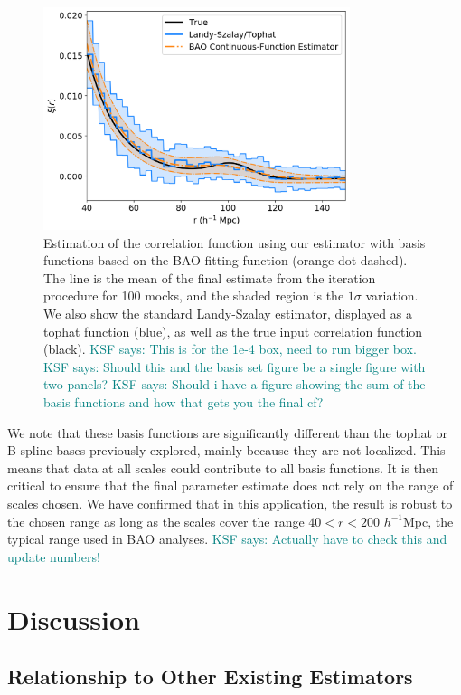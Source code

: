 \documentclass[modern]{aastex62}
\newcommand{\hmpc}{$h^{-1}$Mpc}
\newcommand{\KSF}[1]{\textcolor{teal}{KSF says: #1}}
\begin{document}
\label{fig:bao}
\begin{figure}[th]
\centering
    \includegraphics[width=0.8\textwidth]{bao}
    \caption{Estimation of the correlation function using our estimator with basis functions based on the BAO fitting function (orange dot-dashed). The line is the mean of the final estimate from the iteration procedure for 100 mocks, and the shaded region is the $1\sigma$ variation. We also show the standard Landy-Szalay estimator, displayed as a tophat function (blue), as well as the true input correlation function (black). \KSF{This is for the 1e-4 box, need to run bigger box.} \KSF{Should this and the basis set figure be a single figure with two panels?} \KSF{Should i have a figure showing the sum of the basis functions and how that gets you the final cf?}}
\end{figure}

We note that these basis functions are significantly different than the tophat or B-spline bases previously explored, mainly because they are not localized.
This means that data at all scales could contribute to all basis functions.
It is then critical to ensure that the final parameter estimate does not rely on the range of scales chosen.
We have confirmed that in this application, the result is robust to the chosen range as long as the scales cover the range $40<r<200$ \hmpc, the typical range used in BAO analyses. \KSF{Actually have to check this and update numbers!}


\section{Discussion} \label{sec:discuss}

\subsection{Relationship to Other Existing Estimators}
\end{document}
